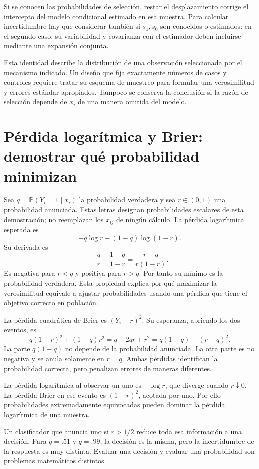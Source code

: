 \documentclass[11pt,a4paper]{article}
\newcommand{\Prob}{\mathbb P}
\begin{document}
Si se conocen las probabilidades de selección,
restar el desplazamiento corrige el intercepto del modelo
condicional estimado en esa muestra.
Para calcular incertidumbre hay que considerar también
si \(s_1,s_0\) son conocidos o estimados:
en el segundo caso, su variabilidad y covarianza con
el estimador deben incluirse mediante una expansión conjunta.

Esta identidad describe la distribución de una observación
seleccionada por el mecanismo indicado.
Un diseño que fija exactamente números de casos y controles
requiere tratar su esquema de muestreo para formular
una verosimilitud y errores estándar apropiados.
Tampoco se conserva la conclusión si la razón de selección
depende de \(x_i\) de una manera omitida del modelo.

\clearpage
\section{Pérdida logarítmica y Brier: demostrar qué probabilidad minimizan}\label{logit81}
Sea \(q=\Prob(Y_i=1\mid x_i)\) la probabilidad verdadera
y sea \(r\in(0,1)\) una probabilidad anunciada.
Estas letras designan probabilidades escalares de esta
demostración; no reemplazan los \(x_{ij}\) de ningún cálculo.
La pérdida logarítmica esperada es
\[
-q\log r-(1-q)\log(1-r).
\]
Su derivada es
\[
-\frac qr+\frac{1-q}{1-r}
=\frac{r-q}{r(1-r)}.
\]
Es negativa para \(r<q\) y positiva para \(r>q\).
Por tanto su mínimo es la probabilidad verdadera.
Esta propiedad explica por qué maximizar la verosimilitud
equivale a ajustar probabilidades usando una pérdida
que tiene el objetivo correcto en población.

La pérdida cuadrática de Brier es \((Y_i-r)^2\).
Su esperanza, abriendo los dos eventos, es
\[
q(1-r)^2+(1-q)r^2
=q-2qr+r^2
=q(1-q)+(r-q)^2.
\]
La parte \(q(1-q)\) no depende de la probabilidad anunciada.
La otra parte es no negativa y se anula solamente en \(r=q\).
Ambas pérdidas identifican la probabilidad correcta,
pero penalizan errores de maneras diferentes.

La pérdida logarítmica al observar un uno es \(-\log r\),
que diverge cuando \(r\downarrow0\).
La pérdida Brier en ese evento es \((1-r)^2\), acotada por uno.
Por ello probabilidades extremadamente equivocadas pueden
dominar la pérdida logarítmica de una muestra.

Un clasificador que anuncia uno si \(r>1/2\) reduce
toda esa información a una decisión.
Para \(q=.51\) y \(q=.99\), la decisión es la misma,
pero la incertidumbre de la respuesta es muy distinta.
Evaluar una decisión y evaluar una probabilidad son
problemas matemáticos distintos.
\end{document}
